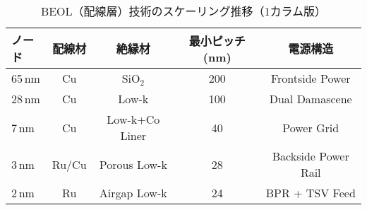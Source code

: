 \begin{table}[t]
  \centering
  \caption{BEOL（配線層）技術のスケーリング推移（1カラム版）}
  \label{tab:beol_scaling}
  \setlength{\tabcolsep}{2pt}       %
  \renewcommand{\arraystretch}{1.05} %
  \footnotesize                     %
  \begin{tabular}{lcccc}
    \toprule
    ノード & 配線材 & 絶縁材 & 最小ピッチ (nm) & 電源構造 \\
    \midrule
    65\,nm  & Cu & SiO$_2$ & 200 & Frontside Power \\
    28\,nm  & Cu & Low-k & 100 & Dual Damascene \\
    7\,nm   & Cu & Low-k+Co Liner & 40 & Power Grid \\
    3\,nm   & Ru/Cu & Porous Low-k & 28 & Backside Power Rail \\
    2\,nm   & Ru & Airgap Low-k & 24 & BPR + TSV Feed \\
    \bottomrule
  \end{tabular}
\end{table}
